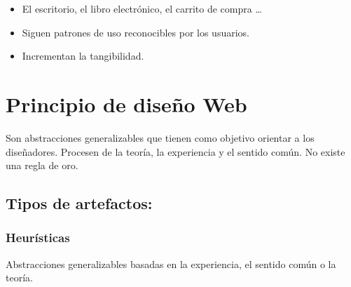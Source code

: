\documentclass[12pt, twoside, openright]{report} %
\begin{document}
\begin{itemize}
\begin{itemize}
        \begin{itemize}
          \item
          El escritorio, el libro electrónico, el carrito de
          compra \ldots{}
  
        \item
          Siguen patrones de uso reconocibles por los usuarios.

          \item
        Incrementan la tangibilidad.
        \end{itemize}
      
      \end{itemize}
    \end{itemize}

\section{Principio de diseño Web}


    Son abstracciones generalizables que tienen como objetivo orientar a
    los diseñadores. Procesen de la teoría, la experiencia y el sentido
    común. No existe una regla de oro.

\subsection{Tipos de artefactos:}

\subsubsection{Heurísticas}
	  Abstracciones generalizables basadas en la
      experiencia, el sentido común o la teoría.
\end{document}
